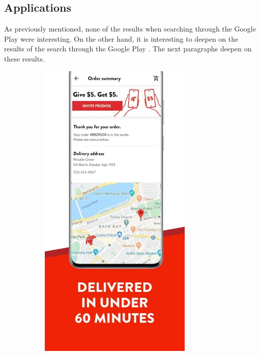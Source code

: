\subsection{Applications}

As previously mentioned, none of the results when searching through the Google Play \cite{googleplay} were interesting. On the other hand, it is interesting to deepen on the results of the search through the Google Play \cite{googleplay}. The next paragraphs deepen on these results.

\begin{figure}[H]
  \centering
  \begin{subfigure}{0.3\textwidth}
      \centering
      \includegraphics[width=0.8\textwidth]{./img/Drizly.png}

\end{subfigure}
\end{figure}
